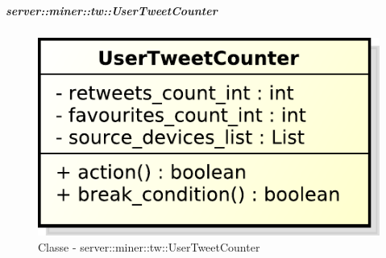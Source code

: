 	\subparagraph{server::miner::tw::UserTweetCounter} %
		\label{subp:server_miner_tw_UserTweetCounter}
		    \begin{figure}[!htbp]
 		 		\centering
 				\centerline{\includegraphics[scale=0.75]{./images/server/classes/miner/user_tweet_counter.pdf}}
 				\caption{Classe - server::miner::tw::UserTweetCounter}
			\end{figure}
